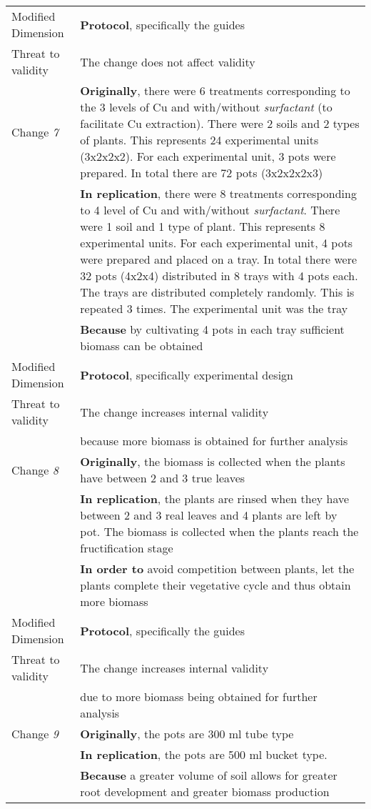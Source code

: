 \begin{table*}[h]
\begin{tabularx}{\textwidth}{
  >{\hsize=0.25\hsize}X
  >{\hsize=0.8\hsize}X}
    Modified Dimension & 
    \textbf{Protocol}, specifically the guides \\   
    Threat to validity  & The change does not affect validity  \\   
\hline 
 Change \textit{7} & \textbf{Originally}, there were 6 treatments corresponding to the 3 levels of Cu and with/without \emph{surfactant} (to facilitate Cu extraction). There were 2 soils and 2 types of plants. This represents 24 experimental units (3x2x2x2). For each experimental unit, 3 pots were prepared. In total there are 72 pots (3x2x2x2x3)\\
& \textbf{In replication}, there were 8 treatments corresponding to 4 level of Cu and with/without \emph{surfactant}. There were 1 soil and 1 type of plant. This represents 8 experimental units. For each experimental unit, 4 pots were prepared and placed on a tray. In total there were 32 pots (4x2x4) distributed in 8 trays with 4 pots each. The trays are distributed completely randomly. This is repeated 3 times. The experimental unit was the tray 
    \\& \textbf{Because} by cultivating 4 pots in each tray sufficient biomass can be obtained \\  
    Modified Dimension & 
    \textbf{Protocol}, specifically experimental
    design \\   
    Threat to validity  & The change increases internal validity \\ & because more biomass is obtained for further analysis\\
\hline
 Change \textit{8}   & \textbf{Originally}, the biomass is collected when the plants have between 2 and 3 true leaves \\& \textbf{In replication}, the plants are rinsed when they have between 2 and 3 real leaves and 4 plants are left by pot. The biomass is collected when the plants reach the fructification stage \\& \textbf{In order to}  avoid competition between plants, let the plants complete their vegetative cycle and thus obtain more biomass \\
    
     Modified Dimension & 
    \textbf{Protocol}, specifically the guides \\   
   Threat to validity  & The change increases internal validity \\ & due to more biomass being obtained for further analysis\\ 
\hline
 Change \textit{9}   & \textbf{Originally}, the pots are 300 ml tube type \\& \textbf{In replication}, the pots are 500 ml bucket type. \\& \textbf{Because} a greater volume of soil allows for greater root development and greater biomass production \\
    

\end{tabularx}
\end{table*}
